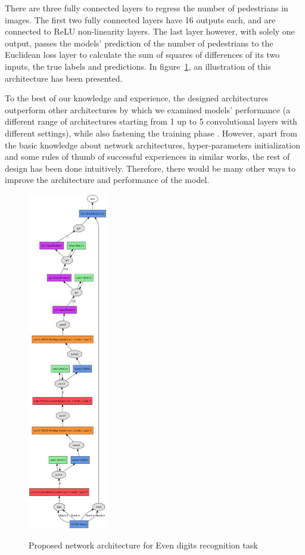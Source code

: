 There are three fully connected layers to regress the number of pedestrians in images. The first two fully connected layers have 16 outputs each, and are connected to ReLU non-linearity layers. The last layer however, with solely one output, passes the models' prediction of the number of pedestrians to the Euclidean loss layer to calculate the sum of squares of differences of its two inputs, the true labels and predictions. In figure~\ref{fig:ucsdnet}, an illustration of this architecture has been presented.

To the best of our knowledge and experience, the designed architectures outperform other architectures by which we examined models' performance (a different range of architectures starting from 1 up to 5 convolutional layers with different settings), while also fastening the training phase . However, apart from the basic knowledge about network architectures, hyper-parameters initialization and some rules of thumb of successful experiences in similar works, the rest of design has been done intuitively. Therefore, there would be many other ways to improve the architecture and performance of the model.  

\begin{figure}[H]
  \centering
   {\includegraphics[width=0.31\textwidth]{images/model}}
	\caption{Proposed network architecture for Even digits recognition task}
	\label{fig:ucsdnet}
\end{figure}

